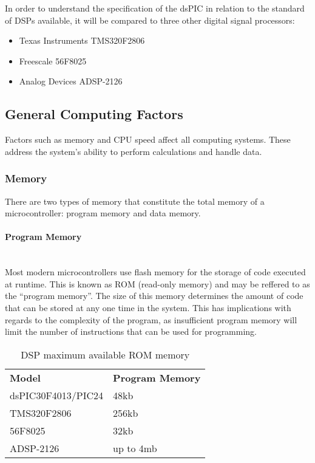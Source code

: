 \documentclass[titlepage]{scrartcl}
\begin{document}
    In order to understand the specification of the dsPIC in relation to the
    standard of DSPs available, it will be compared to three other digital signal
    processors:
    \begin{itemize}
        \item Texas Instruments TMS320F2806
        \item Freescale 56F8025
        \item Analog Devices ADSP-2126
    \end{itemize}

    \subsection{General Computing Factors}
    Factors such as memory and CPU speed affect all computing systems. These
    address the system's ability to perform calculations and handle data.

    \subsubsection{Memory}
    There are two types of memory that constitute the total memory of a
    microcontroller: program memory and data memory.

    \paragraph{Program Memory}~\\
    Most modern microcontrollers use flash memory for the storage of code
    executed at runtime. This is known as ROM (read-only memory) and may be
    reffered to as the ``program memory''. The size of this memory determines
    the amount of code that can be stored at any one time in the system.
    This has implications with regards to the complexity of the program, as
    insufficient program memory will limit the number of instructions that can
    be used for programming.

    \begin{table}[H]
    \centering
    \caption{DSP maximum available ROM memory}
    \label{my-label}
    \begin{tabular}{ll}
        \textbf{Model}     & \textbf{Program Memory}\\
        dsPIC30F4013/PIC24 & 48kb      \\
        TMS320F2806        & 256kb     \\
        56F8025            & 32kb      \\
        ADSP-2126          & up to 4mb
    \end{tabular}
    \end{table}
\end{document}
